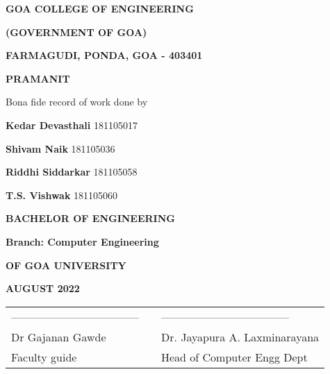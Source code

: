     \thispagestyle{empty}
    \begin{center}
        {\Large \textbf{GOA COLLEGE OF ENGINEERING} \par}
        {\textbf{(GOVERNMENT OF GOA)} \par}
        {\Large \textbf{FARMAGUDI, PONDA, GOA - 403401} \par}
    \vspace{.5cm}

    {\uppercase{\Huge \textbf{PRAMANIT\\}}}
\vspace{.5cm}

    {\large { Bona fide record of work done by} \par }
    \vspace{1cm}
        {\Large{ \textbf{ Kedar Devasthali } 181105017}\par }
        {\Large \textbf{ Shivam Naik }181105036 \par}
        {\Large \textbf{ Riddhi  Siddarkar }181105058 \par}
        {\Large \textbf{ T.S. Vishwak }181105060 \par}
        \vspace{0.5cm}
        
    \end{center}
        { \par }
        \begin{center}
            
        {\Large \textbf{BACHELOR OF ENGINEERING}\par}
        {\Large \textbf{Branch: Computer Engineering}\par}
        {\Large \textbf {OF GOA UNIVERSITY}\par}
        {\Large \textbf{AUGUST 2022}\par}
        \vspace{1.5cm}
        

    \end{center}
    \begin{table}[H]
        \begin{center}
    \begin{tabular}{lcl}
        \noindent ----------------------------------- &\hspace{1cm}&  ----------------------------------- \\
    Dr Gajanan Gawde & \hspace{3cm} & Dr. Jayapura A. Laxminarayana  \\
    Faculty guide        & \hspace{3cm} & Head of Computer Engg Dept    \\
    \end{tabular}
    \end{center}
\end{table}

